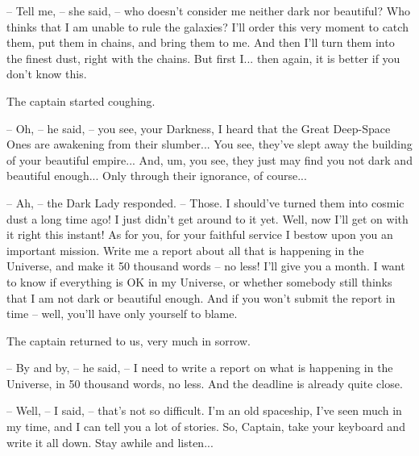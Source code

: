 \documentclass[ebook,oneside,final,openright]{memoir}
\begin{document}
– Tell me, – she said, – who doesn’t consider me neither dark nor beautiful? Who thinks that I am unable to rule the galaxies? I’ll order this very moment to catch them, put them in chains, and bring them to me. And then I’ll turn them into the finest dust, right with the chains. But first I... then again, it is better if you don’t know this.\par
The captain started coughing.\par
– Oh, – he said, – you see, your Darkness, I heard that the Great Deep-Space Ones are awakening from their slumber... You see, they’ve slept away the building of your beautiful empire... And, um, you see, they just may find you not dark and beautiful enough... Only through their ignorance, of course...\par
– Ah, – the Dark Lady responded. – Those. I should’ve turned them into cosmic dust a long time ago! I just didn’t get around to it yet. Well, now I’ll get on with it right this instant! As for you, for your faithful service I bestow upon you an important mission. Write me a report about all that is happening in the Universe, and make it 50 thousand words – no less! I’ll give you a month. I want to know if everything is OK in my Universe, or whether somebody still thinks that I am not dark or beautiful enough. And if you won’t submit the report in time – well, you’ll have only yourself to blame.\par
\par
The captain returned to us, very much in sorrow.\par
– By and by, – he said, – I need to write a report on what is happening in the Universe, in 50 thousand words, no less. And the deadline is already quite close.\par
– Well, – I said, – that’s not so difficult. I’m an old spaceship, I’ve seen much in my time, and I can tell you a lot of stories. So, Captain, take your keyboard and write it all down. Stay awhile and listen...
\end{document}
